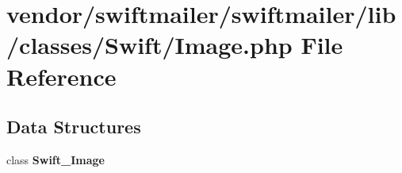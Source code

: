 \section{vendor/swiftmailer/swiftmailer/lib/classes/\+Swift/\+Image.php File Reference}
\label{_image_8php}
\subsection*{Data Structures}
\begin{DoxyCompactItemize}
\item 
class {\bf Swift\+\_\+\+Image}
\end{DoxyCompactItemize}
